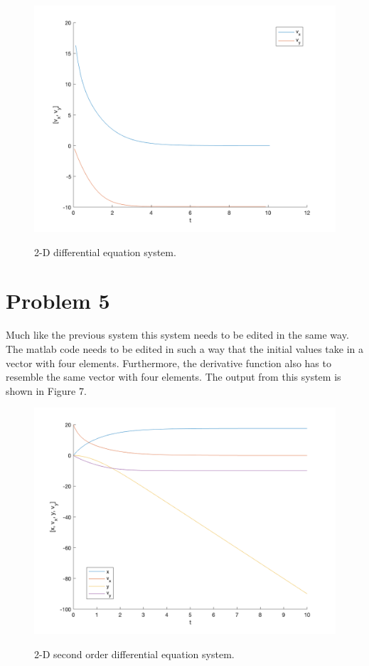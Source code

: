 \documentclass[12pt]{article}
\begin{document}
\begin{figure}[h!]
    \centering
    {{\includegraphics[width=15cm]{problem_4.png}}}%
    \qquad
    \caption{2-D differential equation system.}%
    \label{fig:example}%
\end{figure}

\newpage

\section*{Problem 5}

Much like the previous system this system needs to be edited in the same way.  The matlab code needs to be edited in such a way that the initial values take in a vector with four elements. Furthermore, the derivative function also has to resemble the same vector with four elements. The output from this system is shown in Figure 7.


\begin{figure}[h!]
    \centering
    {{\includegraphics[width=15cm]{problem_5.png}}}%
    \qquad
    \caption{2-D second order differential equation system.}%
    \label{fig:example}%
\end{figure}


 
\end{document}
